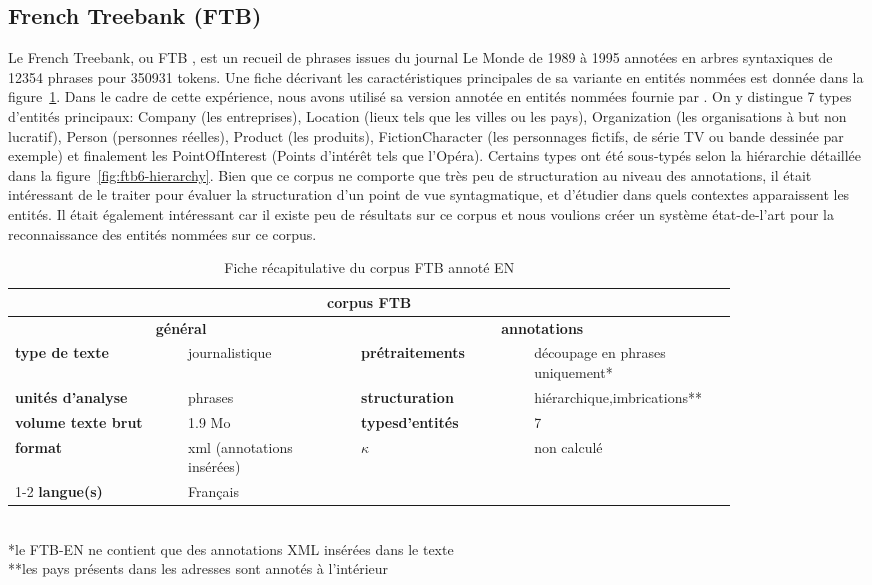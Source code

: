 \documentclass[12pt,a4paper,times,twoside,openright]{report}
\begin{document}
        
        \subsection{French Treebank (FTB)}
        \label{subsec:corpus-FTB}
Le French Treebank, ou FTB \citep{Abeille03}, est un recueil de phrases issues du journal Le Monde de 1989 à 1995 annotées en arbres syntaxiques de 12354 phrases pour 350931 tokens. Une fiche décrivant les caractéristiques principales de sa variante en entités nommées est donnée dans la figure\ \ref{tab:FTB-recap-card}. Dans le cadre de cette expérience, nous avons utilisé sa version annotée en entités nommées fournie par \citet{sagot2012annotation}. On y distingue 7 types d'entités principaux: Company (les entreprises), Location (lieux tels que les villes ou les pays), Organization (les organisations à but non lucratif), Person (personnes réelles), Product (les produits), FictionCharacter (les personnages fictifs, de série TV ou bande dessinée par exemple) et finalement les PointOfInterest (Points d'intérêt tels que l'Opéra). Certains types ont été sous-typés selon la hiérarchie détaillée dans la figure\ \ref{fig:ftb6-hierarchy}. Bien que ce corpus ne comporte que très peu de structuration au niveau des annotations, il était intéressant de le traiter pour évaluer la structuration d'un point de vue syntagmatique, et d'étudier dans quels contextes apparaissent les entités. Il était également intéressant car il existe peu de résultats sur ce corpus et nous voulions créer un système état-de-l'art pour la reconnaissance des entités nommées sur ce corpus.

\begin{table}[ht!]
\centering
\begin{tabular}{|p{0.21\linewidth}|p{0.21\linewidth}|p{0.21\linewidth}|p{0.21\linewidth}|}
\hline
\multicolumn{4}{|c|}{\textbf{corpus FTB}} \\
\hline
\multicolumn{2}{|c|}{\textbf{général}} & \multicolumn{2}{c|}{\textbf{annotations}} \\
\hline
\textbf{type de texte} & journalistique & \textbf{prétraitements} & découpage en phrases uniquement* \\
\hline
\textbf{unités d'analyse} & phrases & \textbf{structuration} & hiérarchique,\newline imbrications** \\
\hline
\textbf{volume texte brut} & 1.9 Mo & \textbf{types\newline d'entités} & 7 \\
\hline
\textbf{format} & xml (annotations insérées) & \multirow{2}{*}{\textbf{$\kappa$}} & \multirow{2}{*}{non calculé} \\
\cline{1-2}
\textbf{langue(s)} & Français & & \\
\hline
\end{tabular}
\scriptsize{\\ *le FTB-EN ne contient que des annotations XML insérées dans le texte}
\scriptsize{\\ **les pays présents dans les adresses sont annotés à l'intérieur}
\caption{Fiche récapitulative du corpus FTB annoté EN}
\label{tab:FTB-recap-card}
\end{table}
\end{document}
